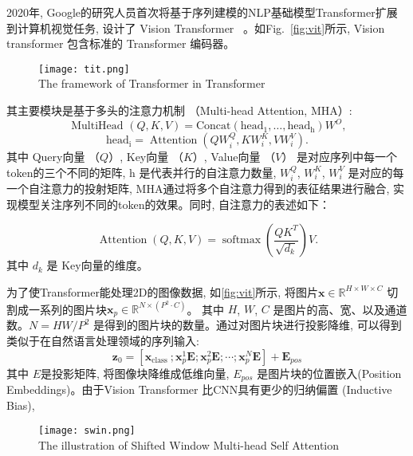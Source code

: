 2020年, Google的研究人员首次将基于序列建模的NLP基础模型Transformer扩展到计算机视觉任务, 设计了 Vision Transformer~\cite{dosovitskiy2020image} 。如Fig.~\ref{fig:vit}所示, Vision transformer 包含标准的 Transformer 编码器。
\begin{figure}[!htp]
    \centering
    \texttt{[image: tit.png]} \\
      {The framework of  Transformer in Transformer}
   \label{fig:tit}
  \end{figure}

其主要模块是基于多头的注意力机制 （Multi-head Attention, MHA）:
\begin{equation}
    \text { MultiHead }(Q, K, V)=\text {Concat}\left(\text {head}_1, \ldots, \text {head}_{\mathrm{h}}\right) W^O,
\end{equation}
\begin{equation}
    \text {head}_{\mathrm{i}}=\operatorname{Attention}\left(Q W_i^Q, K W_i^K, V W_i^V\right).
\end{equation}
其中 Query向量 （$Q$）, Key向量 （$K$）, Value向量 （$V$） 是对应序列中每一个token的三个不同的矩阵, h 是代表并行的自注意力数量, $W_i^Q$, $W_i^K$, $W_i^V$ 是对应的每一个自注意力的投射矩阵, MHA通过将多个自注意力得到的表征结果进行融合, 实现模型关注序列不同的token的效果。同时, 自注意力的表述如下：

\begin{equation}
    \operatorname{Attention}(Q, K, V)=\operatorname{softmax}\left(\frac{Q K^T}{\sqrt{d_k}}\right) V.
    \label{eq:attention}
\end{equation}
其中 $d_k$ 是 Key向量的维度。\par
为了使Transformer能处理2D的图像数据, 如\ref{fig:vit}所示, 将图片$\mathbf{x} \in \mathbb{R}^{H \times W \times C}$ 切割成一系列的图片块$\mathbf{x}_p \in \mathbb{R}^{N \times\left(P^2 \cdot C\right)}$。 其中 $H$, $W$, $C$ 是图片的高、宽、以及通道数。$N=H W / P^2$ 是得到的图片块的数量。通过对图片块进行投影降维, 可以得到类似于在自然语言处理领域的序列输入:
\begin{equation}
    \mathbf{z}_0=\left[\mathbf{x}_{\text {class }} ; \mathbf{x}_p^1 \mathbf{E} ; \mathbf{x}_p^2 \mathbf{E} ; \cdots ; \mathbf{x}_p^N \mathbf{E}\right]+\mathbf{E}_{p o s}
\end{equation}
其中 $E$是投影矩阵, 将图像块降维成低维向量, $E_{pos}$ 是图片块的位置嵌入(Position Embeddings)。由于Vision Transformer 比CNN具有更少的归纳偏置 (Inductive Bias),
\begin{figure}[!htp]
    \centering
    \texttt{[image: swin.png]} \\
      {The illustration of Shifted Window Multi-head Self Attention }
   \label{fig:swin}
\end{figure}

